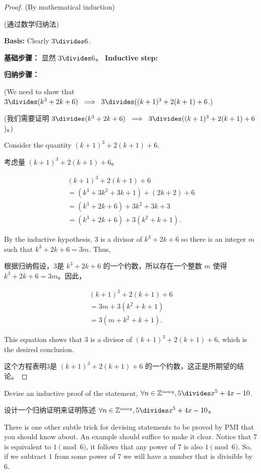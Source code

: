 \begin{proof}
(By mathematical induction)

(通过数学归纳法)

{\bf Basis:} Clearly $3 \divides 6$.

{\bf 基础步骤：} 显然 $3 \divides 6$。
{\bf Inductive step:} 

{\bf 归纳步骤：}

\noindent (We need to show that $3 \divides (k^3 + 2k + 6) \; \implies \; 3 \divides ((k+1)^3 + 2(k+1) + 6$.)

\noindent (我们需要证明 $3 \divides (k^3 + 2k + 6) \; \implies \; 3 \divides ((k+1)^3 + 2(k+1) + 6$)。)

Consider the quantity $(k+1)^3 + 2(k+1) + 6$.

考虑量 $(k+1)^3 + 2(k+1) + 6$。

\begin{gather*}
   (k+1)^3 + 2(k+1) + 6 \\
 = (k^3 + 3k^2 + 3k + 1) + (2k + 2) + 6\\
 = (k^3 + 2k + 6) + 3k^2 + 3k + 3\\
 = (k^3 + 2k + 6) + 3(k^2 + k + 1).
\end{gather*}

By the inductive hypothesis, 3 is a divisor of $k^3 + 2k + 6$ so there
is an integer $m$ such that $k^3 + 2k + 6 = 3m$.
Thus,

根据归纳假设，3是 $k^3 + 2k + 6$ 的一个约数，所以存在一个整数 $m$ 使得 $k^3 + 2k + 6 = 3m$。因此，

\begin{gather*}
(k+1)^3 + 2(k+1) + 6 \\
= 3m + 3(k^2 + k + 1) \\
= 3(m + k^2 + k + 1).
\end{gather*}

This equation shows that 3 is a divisor of $(k+1)^3 + 2(k+1) + 6$, which
is the desired conclusion.

这个方程表明3是 $(k+1)^3 + 2(k+1) + 6$ 的一个约数，这正是所期望的结论。
\end{proof}

\begin{exer}
Devise an inductive proof of the statement, $\forall n \in \Naturals, 5 \divides x^5+4x-10$.

设计一个归纳证明来证明陈述 $\forall n \in \Naturals, 5 \divides x^5+4x-10$。
\end{exer}

There is one other subtle trick for devising statements to be
proved by PMI that you should know about.  An example should 
suffice to make it clear.  Notice that $7$ is equivalent to $1 \pmod{6}$,
it follows that any power of $7$ is also $1 \pmod{6}$.  So, if we subtract
$1$ from some power of 7 we will have a number that is divisible by $6$.

